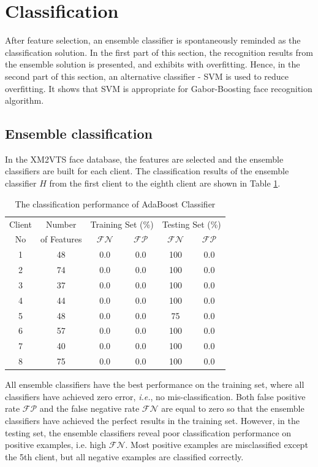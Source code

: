 \documentclass[a4paper,10pt]{article}
\begin{document}
\section{Classification}
\label{classification}
After feature selection, an ensemble classifier is spontaneously reminded as the classification solution. In the first part of this section, the recognition results from the ensemble solution is presented, and exhibits with overfitting. Hence, in the second part of this section, an alternative classifier - SVM is used to reduce overfitting. It shows that SVM is appropriate for Gabor-Boosting face recognition algorithm.

\subsection{Ensemble classification}
In the \mbox{XM2VTS} face database, the features are selected and the ensemble classifiers are built for each client. The classification results of the ensemble classifier $H$ from the first client to the eighth client are shown in \mbox{Table} \ref{tab:normalresultsclassify}.
\begin{table}
\caption{The classification performance of AdaBoost Classifier}
\begin{center}
 \begin{tabular}{|c|c|c|c|c|c|}
  \hline
  Client & Number & \multicolumn{2}{c|}{Training Set (\%)} & \multicolumn{2}{c|}{Testing Set (\%)}\\
  \cline{3-6}
  No & of Features & $ \mathcal{FN}$ & $ \mathcal{FP}$ & $ \mathcal{FN}$ & $ \mathcal{FP}$ \\
  \hline
  1 & 48 & 0.0 & 0.0 & 100 & 0.0 \\
  2 & 74 & 0.0 & 0.0 & 100 & 0.0 \\
  3 & 37 & 0.0 & 0.0 & 100 & 0.0 \\
  4 & 44 & 0.0 & 0.0 & 100 & 0.0 \\
  5 & 48 & 0.0 & 0.0 & 75 & 0.0 \\
  6 & 57 & 0.0 & 0.0 & 100 & 0.0 \\
  7 & 40 & 0.0 & 0.0 & 100 & 0.0 \\
  8 & 75 & 0.0 & 0.0 & 100 & 0.0 \\
  \hline
 \end{tabular} 
\label{tab:normalresultsclassify}
\end{center}
\end{table} 
All ensemble classifiers have the best performance on the training set, where all classifiers have achieved zero error, \textit{i.e.}, no mis-classification. Both false positive rate $\mathcal{FP}$ and the false negative rate $\mathcal{FN}$ are equal to zero so that the ensemble classifiers have achieved the perfect results in the training set. However, in the testing set, the ensemble classifiers reveal poor classification performance on positive examples, i.e. high $\mathcal{FN}$. Most positive examples are misclassified except the 5th client, but all negative examples are classified correctly.
\end{document}
